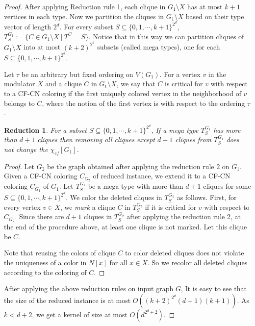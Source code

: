 \documentclass[svgnames]{llncs}
\newtheorem{Reduction}{Reduction}
\newcommand{\cfcn}{\textsc {CF-CN}}
\begin{document}
\begin{proof}
After applying Reduction rule 1, each clique in $G_1 \setminus X$ has at most $k+1$ vertices in each type.
Now we partition the cliques in $G_1 \setminus X$ based on their type vector of length $2^d$. 
For every subset $S \subseteq \{0,1, \cdots, k+1\}^{2^d}$, $T_S^{G_1}:=\{ C \in G_1 \setminus X ~|~ T^C=S\}$. 
Notice that in this way we can partition cliques of $G_1 \setminus X$ into at most $({k+2})^{2^{d}}$ subsets (called mega types), 
one for each $S \subseteq \{0,1, \cdots, k+1\}^{2^d}$.

Let $\tau$ be an arbitrary but fixed ordering on $V(G_1)$. For a vertex $v$ in the modulator $X$ and a clique $C$ in $G_1 \setminus X$, we say that $C$ is critical for $v$ with respect to a \cfcn{} coloring if the first uniquely colored vertex in the neighborhood of $v$ belongs to $C$, where the notion of the first vertex is with respect to the ordering $\tau$. 

\begin{Reduction}
For a subset $S \subseteq \{0,1, \cdots, k+1\}^{2^d}$, If a mega type $T_S^{G_1}$ has more than $d+1$ cliques then removing all cliques except $d+1$ cliques from $T_S^{G_1}$ does not change the $ \chi_{cf} [G_1]$.
\end{Reduction}

\begin{proof}
Let $G_2$ be the graph obtained after applying the reduction rule $2$ on $G_1$.
Given a \cfcn{} coloring $C_{G_2}$ of reduced instance, we extend it to a \cfcn{} coloring $C_{G_1}$ of $G_1$.
Let $T_S^{G_1}$ be a mega type with more than $d+1$ cliques for some $S \subseteq \{0,1, \cdots, k+1\}^{2^d}$.
We color the  deleted cliques in $T_S^{G_1}$ as follows. First, for every vertex $v \in X$, we \textit{mark} a clique $C$ in $T_S^{G_2}$ if it is critical for $v$ with respect to $C_{G_2}$.  
Since there are $d+1$ cliques in $T_S^{G_2}$ after applying the reduction rule 2, at the end of the procedure above, at least one clique is not marked. Let this clique be $C$.


Note that reusing the colors of clique $C$ to color deleted cliques does not violate the uniqueness of a color in $N[x]$ for all $x \in X$.
So we recolor all deleted cliques according to the coloring of $C$.
\end{proof}
After applying the above reduction rules on input graph $G$, It is easy to see that the size of the reduced instance is at most $O((k+2)^{2^d}(d+1)(k+1))$. As
$k < d+2$, we get a kernel of size at most  $O(d^{2^d+2})$.


\end{proof}
\end{document}
